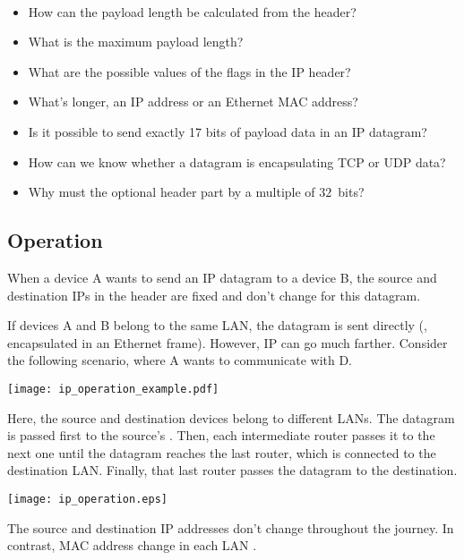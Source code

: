 \begin{exercise} \ \\[-0.5cm]
\begin{itemize}
\item How can the payload length be calculated from the header?
\item What is the maximum payload length?
\item What are the possible values of the flags in the IP header?
\item What's longer, an IP address or an Ethernet MAC address?
\item Is it possible to send exactly 17 bits of payload data in an IP datagram?
\item How can we know whether a datagram is encapsulating TCP or UDP data?
\item Why must the optional header part by a multiple of $32$~bits?
\end{itemize}
\end{exercise}

\subsection*{Operation}

When a device A wants to send an IP datagram to a device B, the source and 
destination IPs in the header are fixed and don't change for this datagram.

If devices A and B belong to the same LAN, the datagram is sent directly
(\eg, encapsulated in an Ethernet frame). However, IP can go much farther.
Consider the following scenario, where A wants to communicate with D.

\begin{center}
 \texttt{[image: ip\_operation\_example.pdf]}
\end{center}


Here, the source and destination devices belong to different LANs.
The datagram is passed first to the source's . 
Then, each intermediate router passes it to the next one until the datagram reaches 
the last router, which is connected to the destination LAN. Finally, that last router 
passes the datagram to the destination. 

\texttt{[image: ip\_operation.eps]}


The source and destination IP addresses don't change throughout the journey.
In contrast, MAC address change in each LAN . 

